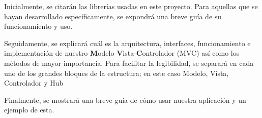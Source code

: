 \documentclass[12pt,journal,compsoc]{IEEEtran}
\begin{document}
Inicialmente, se citarán las librerías usadas en este proyecto. Para aquellas que se hayan desarrollado específicamente, se expondrá una breve guía de su funcionamiento y uso.\bigskip

Seguidamente, se explicará cuál es la arquitectura, interfaces, funcionamiento e implementación de nuestro \textbf{M}odelo-\textbf{V}ista-\textbf{C}ontrolador (MVC) así como los métodos de mayor importancia. Para facilitar la legibilidad, se separará en cada uno de los grandes bloques de la estructura; en este caso Modelo, Vista, Controlador y Hub\bigskip

Finalmente, se mostrará una breve guía de cómo usar nuestra aplicación y un ejemplo de esta.







\end{document}
